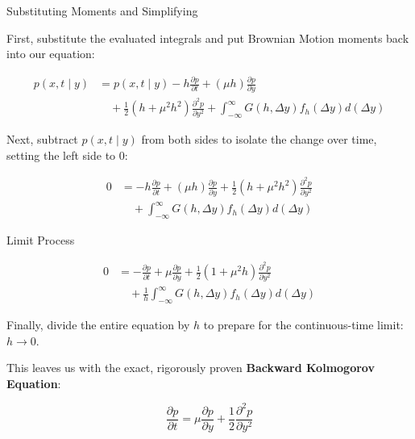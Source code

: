 \documentclass{beamer}
\begin{document}
\begin{frame}{Substituting Moments and Simplifying}

First, substitute the evaluated integrals and put Brownian Motion moments back into our equation:

\begin{align*}
p(x, t \mid y) &= p(x, t \mid y) - h \frac{\partial p}{\partial t} + (\mu h) \frac{\partial p}{\partial y} \\
&\quad + \frac{1}{2}(h + \mu^2 h^2) \frac{\partial^2 p}{\partial y^2} + \int_{-\infty}^{\infty} G(h, \Delta y) f_h(\Delta y) d(\Delta y)
\end{align*}

Next, subtract $p(x,t \mid y)$ from both sides to isolate the change over time, setting the left side to $0$:

\begin{align*}
0 &= - h \frac{\partial p}{\partial t} + (\mu h) \frac{\partial p}{\partial y} + \frac{1}{2}(h + \mu^2 h^2) \frac{\partial^2 p}{\partial y^2} \\
&\quad + \int_{-\infty}^{\infty} G(h, \Delta y) f_h(\Delta y) d(\Delta y)
\end{align*}
\end{frame}

\begin{frame}{Limit Process}

\begin{align*}
0 &= -\frac{\partial p}{\partial t} + \mu\frac{\partial p}{\partial y} + \frac{1}{2}(1 + \mu^2 h)\frac{\partial^2 p}{\partial y^2} \\
&\quad + \frac{1}{h}\int_{-\infty}^\infty G(h, \Delta y)f_h(\Delta y)d(\Delta y)
\end{align*}

Finally, divide the entire equation by $h$ to prepare for the continuous-time limit: $h \to 0$.

This leaves us with the exact, rigorously proven 
\textbf{Backward Kolmogorov Equation}:

$$\frac{\partial p}{\partial t} = \mu\frac{\partial p}{\partial y} + \frac{1}{2}\frac{\partial^2 p}{\partial y^2}$$

\end{frame}
\end{document}
